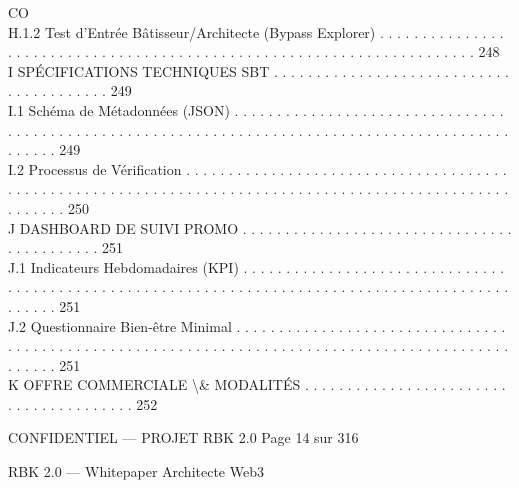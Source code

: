 CO\\
H.1.2               Test d’Entrée Bâtisseur/Architecte (Bypass Explorer) . . . . . . . . . . . . . . . . . . . . . . . . . . . . . . . . . . . . . . . . . . . . . . . . . . . . . . . . . . . . . . . . . . . . . . 248\\
\vspace{0.5em}
I     SPÉCIFICATIONS TECHNIQUES SBT . . . . . . . . . . . . . . . . . . . . . . . . . . . . . . . . . . . . . . . . 249\\
I.1     Schéma de Métadonnées (JSON) . . . . . . . . . . . . . . . . . . . . . . . . . . . . . . . . . . . . . . . . . . . . . . . . . . . . . . . . . . . . . . . . . . . . . . . . . . . . . . . . . . . . . . . . . . . . . . . . . 249\\
I.2     Processus de Vérification . . . . . . . . . . . . . . . . . . . . . . . . . . . . . . . . . . . . . . . . . . . . . . . . . . . . . . . . . . . . . . . . . . . . . . . . . . . . . . . . . . . . . . . . . . . . . . . . . . . . . . . . 250\\
\vspace{0.5em}
J     DASHBOARD DE SUIVI PROMO . . . . . . . . . . . . . . . . . . . . . . . . . . . . . . . . . . . . . . . . . . . 251\\
J.1     Indicateurs Hebdomadaires (KPI) . . . . . . . . . . . . . . . . . . . . . . . . . . . . . . . . . . . . . . . . . . . . . . . . . . . . . . . . . . . . . . . . . . . . . . . . . . . . . . . . . . . . . . . . . . . . . . . . 251\\
J.2     Questionnaire Bien-être Minimal . . . . . . . . . . . . . . . . . . . . . . . . . . . . . . . . . . . . . . . . . . . . . . . . . . . . . . . . . . . . . . . . . . . . . . . . . . . . . . . . . . . . . . . . . . . . . . . . . 251\\
\vspace{0.5em}
K     OFFRE COMMERCIALE \textbackslash{}& MODALITÉS . . . . . . . . . . . . . . . . . . . . . . . . . . . . . . . . . . . . . . . 252\\
\vspace{0.5em}
\vspace{0.5em}
\begin{confidential}CONFIDENTIEL — PROJET RBK 2.0                                                                              Page 14 sur 316\end{confidential}
RBK 2.0 — Whitepaper Architecte Web3\\
\vspace{0.5em}
\vspace{0.5em}
